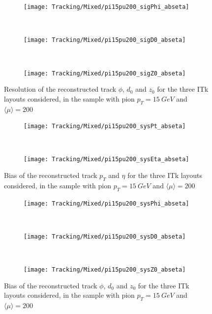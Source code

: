 \documentclass[a4paper,twoside,12pt]{book}
\begin{document}
\begin{figure}
\begin{subfigure}{\linewidth}
\centering
\texttt{[image: Tracking/Mixed/pi15pu200\_sigPhi\_abseta]}
\caption{}
\label{fig:tracking:pi15pu200_sigPhi_abseta}
\end{subfigure}\\[1ex]
\begin{subfigure}{\linewidth}
\centering
\texttt{[image: Tracking/Mixed/pi15pu200\_sigD0\_abseta]}
\caption{}
\label{fig:tracking:pi15pu200_sigD0_abseta}
\end{subfigure}\\[1ex]
\begin{subfigure}{\linewidth}
\centering
\texttt{[image: Tracking/Mixed/pi15pu200\_sigZ0\_abseta]}
\caption{}
\label{fig:tracking:pi15pu200_sigZ0_abseta}
\end{subfigure}
\caption{Resolution of the reconstructed track $\phi$, $d_{0}$ and $z_{0}$ for the three ITk layouts considered, in the sample with pion $p_{T} = 15\ GeV$ and $\langle\mu\rangle = 200$}
\label{fig:tracking:pionResolution-2}
\end{figure}

\begin{figure}
\begin{subfigure}{\linewidth}
\centering
\texttt{[image: Tracking/Mixed/pi15pu200\_sysPt\_abseta]}
\caption{}
\label{fig:tracking:pi15pu200_sysPt_abseta}
\end{subfigure}\\[1ex]
\begin{subfigure}{\linewidth}
\centering
\texttt{[image: Tracking/Mixed/pi15pu200\_sysEta\_abseta]}
\caption{}
\label{fig:tracking:pi15pu200_sysD0_abseta}
\end{subfigure}
\caption{Bias of the reconstructed track $p_{T}$ and $\eta$ for the three ITk layouts considered, in the sample with pion $p_{T} = 15\ GeV$ and $\langle\mu\rangle = 200$}
\label{fig:tracking:pionBias-1}
\end{figure}


\begin{figure}
\begin{subfigure}{\linewidth}
\centering
\texttt{[image: Tracking/Mixed/pi15pu200\_sysPhi\_abseta]}
\caption{}
\label{fig:tracking:pi15pu200_sysPhi_abseta}
\end{subfigure}\\[1ex]
\begin{subfigure}{\linewidth}
\centering
\texttt{[image: Tracking/Mixed/pi15pu200\_sysD0\_abseta]}
\caption{}
\label{fig:tracking:pi15pu200_sysD0_abseta}
\end{subfigure}\\[1ex]
\begin{subfigure}{\linewidth}
\centering
\texttt{[image: Tracking/Mixed/pi15pu200\_sysZ0\_abseta]}
\caption{}
\label{fig:tracking:pi15pu200_sysZ0_abseta}
\end{subfigure}
\caption{Bias of the reconstructed track $\phi$, $d_{0}$ and $z_{0}$ for the three ITk layouts considered, in the sample with pion $p_{T} = 15\ GeV$ and $\langle\mu\rangle = 200$}
\label{fig:tracking:pionBias-2}
\end{figure}
\end{document}
